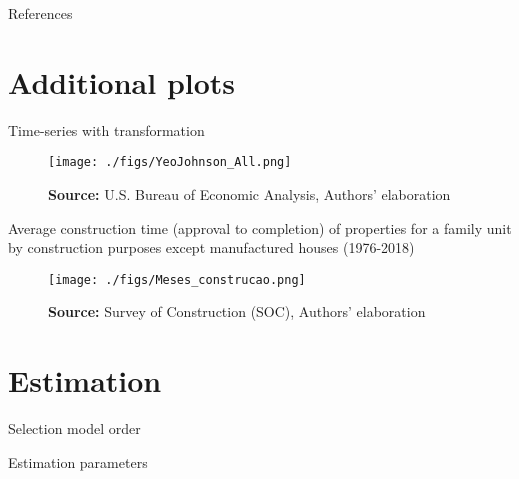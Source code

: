 \documentclass[10pt]{beamer}
\begin{document}
\appendix

\begin{frame}[allowframebreaks]{References}
\printbibliography[heading=none]

\end{frame}



\section{Additional plots}


\begin{frame}{Time-series with \textcite{yeo_new_2000} transformation}

\begin{figure}[htb]
	\centering
	\label{YeoJhonson}
	\texttt{[image: ./figs/YeoJohnson\_All.png]}
	\caption*{\textbf{Source:} U.S. Bureau of Economic Analysis, Authors' elaboration}
\end{figure}
\end{frame}

\begin{frame}{Average construction time (approval to completion) of properties for a family unit by construction purposes except manufactured houses (1976-2018)}
\begin{figure}[H]
	\centering
	\texttt{[image: ./figs/Meses\_construcao.png]}
	\caption*{\textbf{Source:} Survey of Construction (SOC), Authors' elaboration}
\end{figure}

\end{frame}

\section{Estimation}

\begin{frame}{Selection model order}
\scriptsize{}
\end{frame}

\begin{frame}{Estimation parameters}
\begin{table}[H]
	\centering
    \caption{VECM parameters - four lags}
    \label{Estimacao}
    \resizebox*{!}{\dimexpr\textheight-15\lineskip\relax}{%
	     
               }
\end{table}
\end{frame}
\end{document}
